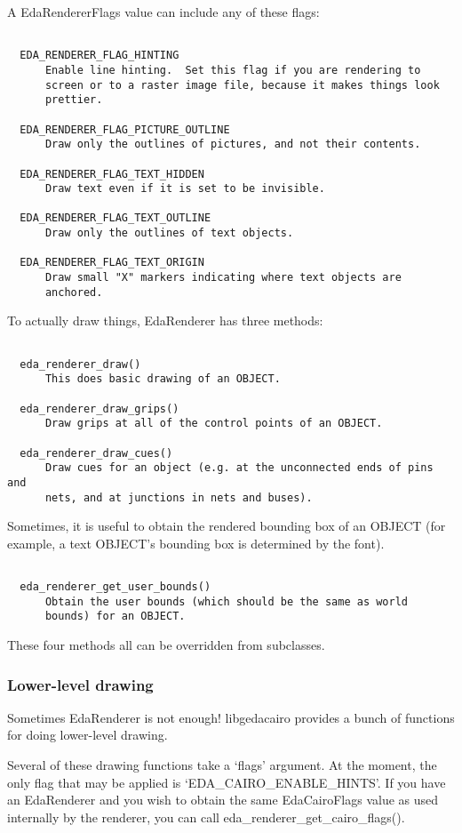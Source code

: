   A EdaRendererFlags value can include any of these flags: \begin{verbatim}

  EDA_RENDERER_FLAG_HINTING
      Enable line hinting.  Set this flag if you are rendering to
      screen or to a raster image file, because it makes things look
      prettier.

  EDA_RENDERER_FLAG_PICTURE_OUTLINE
      Draw only the outlines of pictures, and not their contents.

  EDA_RENDERER_FLAG_TEXT_HIDDEN
      Draw text even if it is set to be invisible.

  EDA_RENDERER_FLAG_TEXT_OUTLINE
      Draw only the outlines of text objects.

  EDA_RENDERER_FLAG_TEXT_ORIGIN
      Draw small "X" markers indicating where text objects are
      anchored.

\end{verbatim}
 To actually draw things, EdaRenderer has three methods: \begin{verbatim}

  eda_renderer_draw()
      This does basic drawing of an OBJECT.

  eda_renderer_draw_grips()
      Draw grips at all of the control points of an OBJECT.

  eda_renderer_draw_cues()
      Draw cues for an object (e.g. at the unconnected ends of pins and
      nets, and at junctions in nets and buses).

\end{verbatim}
 Sometimes, it is useful to obtain the rendered bounding box of an OBJECT (for example, a text OBJECT's bounding box is determined by the font). \begin{verbatim}

  eda_renderer_get_user_bounds()
      Obtain the user bounds (which should be the same as world
      bounds) for an OBJECT.

\end{verbatim}
 These four methods all can be overridden from subclasses.
\subsubsection*{Lower-level drawing}
 Sometimes EdaRenderer is not enough! libgedacairo provides a bunch of functions for doing lower-level drawing.

  Several of these drawing functions take a `flags' argument. At the moment, the only flag that may be applied is `EDA\_CAIRO\_ENABLE\_HINTS'. If you have an EdaRenderer and you wish to obtain the same EdaCairoFlags value as used internally by the renderer, you can call eda\_renderer\_get\_cairo\_flags().


